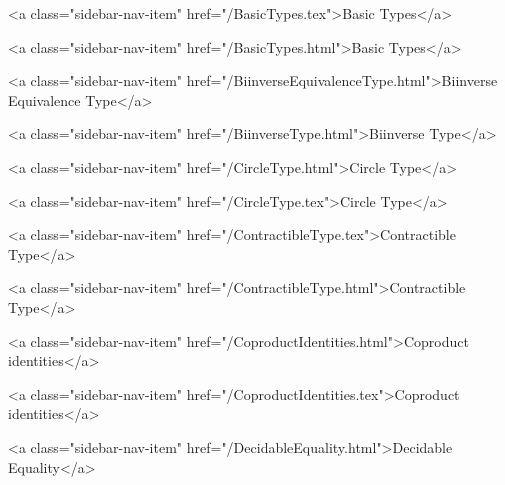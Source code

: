       
        
          <a class="sidebar-nav-item" href="/BasicTypes.tex">Basic Types</a>
        
      
    
      
        
          <a class="sidebar-nav-item" href="/BasicTypes.html">Basic Types</a>
        
      
    
      
        
          <a class="sidebar-nav-item" href="/BiinverseEquivalenceType.html">Biinverse Equivalence Type</a>
        
      
    
      
        
          <a class="sidebar-nav-item" href="/BiinverseType.html">Biinverse Type</a>
        
      
    
      
        
          <a class="sidebar-nav-item" href="/CircleType.html">Circle Type</a>
        
      
    
      
        
          <a class="sidebar-nav-item" href="/CircleType.tex">Circle Type</a>
        
      
    
      
        
          <a class="sidebar-nav-item" href="/ContractibleType.tex">Contractible Type</a>
        
      
    
      
        
          <a class="sidebar-nav-item" href="/ContractibleType.html">Contractible Type</a>
        
      
    
      
        
          <a class="sidebar-nav-item" href="/CoproductIdentities.html">Coproduct identities</a>
        
      
    
      
        
          <a class="sidebar-nav-item" href="/CoproductIdentities.tex">Coproduct identities</a>
        
      
    
      
        
          <a class="sidebar-nav-item" href="/DecidableEquality.html">Decidable Equality</a>
        

